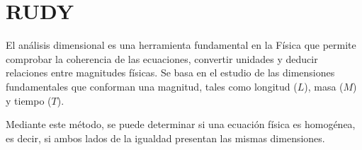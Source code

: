 \section{RUDY}
El análisis dimensional es una herramienta fundamental en la Física que permite comprobar la coherencia de las ecuaciones, convertir unidades y deducir relaciones entre magnitudes físicas. Se basa en el estudio de las dimensiones fundamentales que conforman una magnitud, tales como longitud (\(L\)), masa (\(M\)) y tiempo (\(T\)).

Mediante este método, se puede determinar si una ecuación física es homogénea, es decir, si ambos lados de la igualdad presentan las mismas dimensiones.
